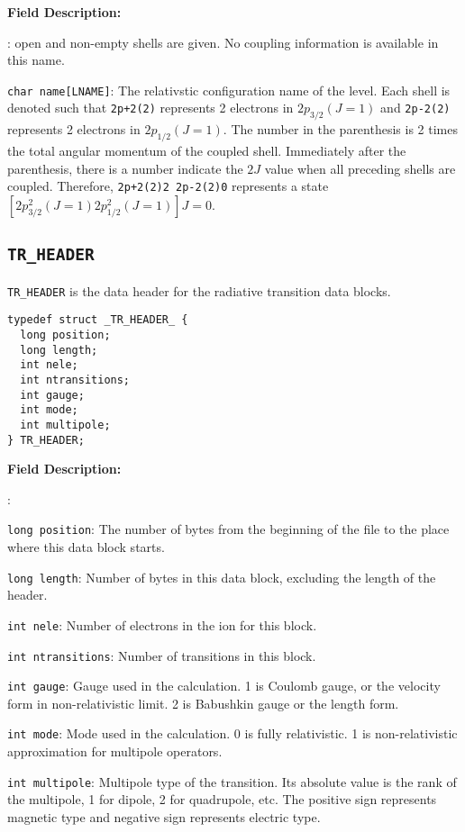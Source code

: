\documentclass[twoside,letterpaper]{refrep}
\newenvironment{dbdesc}{\textbf{Field Description:} \begin{list}
	{:}{\setlength{\labelwidth}{2in}
	   \setlength{\leftmargin}{2in}
	   \setlength{\labelsep}{0.1in}
	   \setlength{\rightmargin}{0.2in}}}
	{\end{list}}
\begin{document}
\begin{dbdesc}
open and non-empty shells are given. No coupling information is available in
this name.
\item[\texttt{char name[LNAME]}:] The relativstic configuration name of the
level. Each shell is denoted such that \verb|2p+2(2)| represents 2 electrons in
$2p_{3/2}(J=1)$ and \verb|2p-2(2)| represents 2 electrons in
$2p_{1/2}(J=1)$. The number in the parenthesis is 2 times the total angular
momentum of the coupled shell. Immediately after the parenthesis, there is a
number indicate the $2J$ value when all preceding shells are
coupled. Therefore, \verb|2p+2(2)2 2p-2(2)0| represents a state
$[2p_{3/2}^{2}(J=1) 2p_{1/2}^2(J=1)]J=0$.
\end{dbdesc}

\subsection{\texttt{TR\_HEADER}}
\texttt{TR\_HEADER} is the data header for the radiative transition data
blocks. 

\begin{verbatim}
typedef struct _TR_HEADER_ {
  long position;
  long length;
  int nele;
  int ntransitions;
  int gauge;
  int mode;
  int multipole;
} TR_HEADER;
\end{verbatim}

\begin{dbdesc}
\item[\texttt{long position}:] The number of bytes from the beginning of the
file to the place where this data block starts.
\item[\texttt{long length}:] Number of bytes in this data block, excluding the
length of the header.
\item[\texttt{int nele}:] Number of electrons in the ion for this block.
\item[\texttt{int ntransitions}:] Number of transitions in this block.
\item[\texttt{int gauge}:] Gauge used in the calculation. 1 is Coulomb gauge, or
the velocity form in non-relativistic limit. 2 is Babushkin gauge or the
length form.
\item[\texttt{int mode}:] Mode used in the calculation. 0 is fully
relativistic. 1 is non-relativistic approximation for multipole operators.
\item[\texttt{int multipole}:] Multipole type of the transition. Its absolute
value is the rank of the multipole, 1 for dipole, 2 for quadrupole, etc. The
positive sign represents magnetic type and negative sign represents electric type.
\end{dbdesc}
\end{document}
